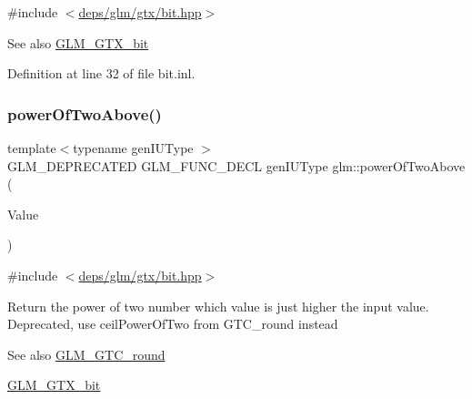 {\ttfamily \#include $<$\hyperlink{bit_8hpp}{deps/glm/gtx/bit.\+hpp}$>$}

\begin{DoxySeeAlso}{See also}
\hyperlink{group__gtx__bit}{G\+L\+M\+\_\+\+G\+T\+X\+\_\+bit} 
\end{DoxySeeAlso}


Definition at line 32 of file bit.\+inl.

\mbox{\label{group__gtx__bit_ga8cda2459871f574a0aecbe702ac93291}} 
\subsubsection{\texorpdfstring{power\+Of\+Two\+Above()}{powerOfTwoAbove()}\hspace{0.1cm}{\footnotesize\ttfamily [1/2]}}
{\footnotesize\ttfamily template$<$typename gen\+I\+U\+Type $>$ \\
G\+L\+M\+\_\+\+D\+E\+P\+R\+E\+C\+A\+T\+ED G\+L\+M\+\_\+\+F\+U\+N\+C\+\_\+\+D\+E\+CL gen\+I\+U\+Type glm\+::power\+Of\+Two\+Above (\begin{DoxyParamCaption}\item[{gen\+I\+U\+Type}]{Value }\end{DoxyParamCaption})}



{\ttfamily \#include $<$\hyperlink{bit_8hpp}{deps/glm/gtx/bit.\+hpp}$>$}

Return the power of two number which value is just higher the input value. Deprecated, use ceil\+Power\+Of\+Two from G\+T\+C\+\_\+round instead

\begin{DoxySeeAlso}{See also}
\hyperlink{group__gtc__round}{G\+L\+M\+\_\+\+G\+T\+C\+\_\+round} 

\hyperlink{group__gtx__bit}{G\+L\+M\+\_\+\+G\+T\+X\+\_\+bit} 
\end{DoxySeeAlso}
\mbox{\label{group__gtx__bit_ga2bbded187c5febfefc1e524ba31b3fab}} 

